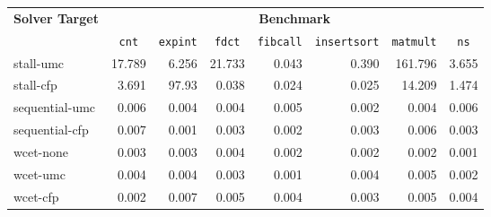
\begin{tabular}{|l||r|r|r|r|r|r|r|}
\hline

\multirow{2}{*}{\bf Solver Target}&\multicolumn{7}{c|}{\bf Benchmark}       \\ \cline{2-8}
&\multicolumn{1}{c|}{\tt cnt}&\multicolumn{1}{c|}{\tt expint}&\multicolumn{1}{c|}{\tt fdct}&\multicolumn{1}{c|}{\tt fibcall}&\multicolumn{1}{c|}{\tt insertsort}&\multicolumn{1}{c|}{\tt matmult}&\multicolumn{1}{c|}{\tt ns}\\ \hline \hline
stall-umc&17.789&6.256&21.733&0.043&0.390&161.796&3.655\\ \hline
stall-cfp&3.691&97.93&0.038&0.024&0.025&14.209&1.474\\ \hline \hline
sequential-umc&0.006&0.004&0.004&0.005&0.002&0.004&0.006\\ \hline
sequential-cfp&0.007&0.001&0.003&0.002&0.003&0.006&0.003\\ \hline \hline
wcet-none&0.003&0.003&0.004&0.002&0.002&0.002&0.001\\ \hline
wcet-umc&0.004&0.004&0.003&0.001&0.004&0.005&0.002\\ \hline
wcet-cfp&0.002&0.007&0.005&0.004&0.003&0.005&0.004\\ \hline

\end{tabular}
